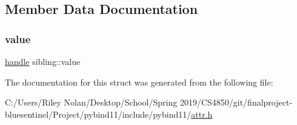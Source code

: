 \subsection{Member Data Documentation}
\mbox{\label{structsibling_a3e9e0ab053e64c98c3baf8e81572df97}} 
\subsubsection{\texorpdfstring{value}{value}}
{\footnotesize\ttfamily \mbox{\hyperlink{classhandle}{handle}} sibling\+::value}



The documentation for this struct was generated from the following file\+:\begin{DoxyCompactItemize}
\item 
C\+:/\+Users/\+Riley Nolan/\+Desktop/\+School/\+Spring 2019/\+C\+S4850/git/finalproject-\/bluesentinel/\+Project/pybind11/include/pybind11/\mbox{\hyperlink{attr_8h}{attr.\+h}}\end{DoxyCompactItemize}
